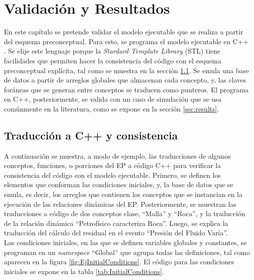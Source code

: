 \chapter{Validación y Resultados}\label{cap:Validacion}


En este capítulo se pretende validar el modelo ejecutable que se realiza a partir del esquema preconceptual. Para esto, se programa el modelo ejecutable en C++ \citep{ISO:2017:IIIa}. Se elije este lenguaje porque la \textit{Stardard Template Library} (STL) tiene facilidades que permiten hacer la consistencia del código con el esquema preconceptual explícita, tal como se muestra en la sección \ref{sec:conc++}. Se emula una base de datos a partir de arreglos globales que almacenan cada concepto, y, las claves foráneas que se generan entre conceptos se traducen como punteros. El programa en C++, posteriormente, se valida con un caso de simulación que se usa comúnmente en la literatura, como se expone en la sección \ref{sec:results}.

\section{Traducción a C++ y consistencia}\label{sec:conc++}
A continuación se muestra, a modo de ejemplo, las traducciones de algunos conceptos, funciones, o porciones del EP a código C++ para verificar la consistencia del código con el modelo ejecutable. Primero, se definen los elementos que conforman las condiciones iniciales, y, la base de datos que se emula, es decir, los arreglos que contienen los conceptos que se instancian en la ejecución de las relaciones dinámicas del EP. Posteriormente, se muestran las traducciones a código de dos conceptos clase, ``Malla'' y ``Roca'', y la traducción de la relación dinámica ``Petrofísico caracteriza Roca''. Luego, se explica la traducción del cálculo del residual en el evento ``Presión del Fluido Varía''.\\

Las condiciones iniciales, en las que se definen variables globales y constantes, se programan en un \textit{namespace} ``Global'' que agrupa todas las definiciones, tal como aparecen en la figura \ref{fig:EjInitialConditions}. El código para las condiciones iniciales se expone en la tabla \ref{tab:InitialConditions}.\\

